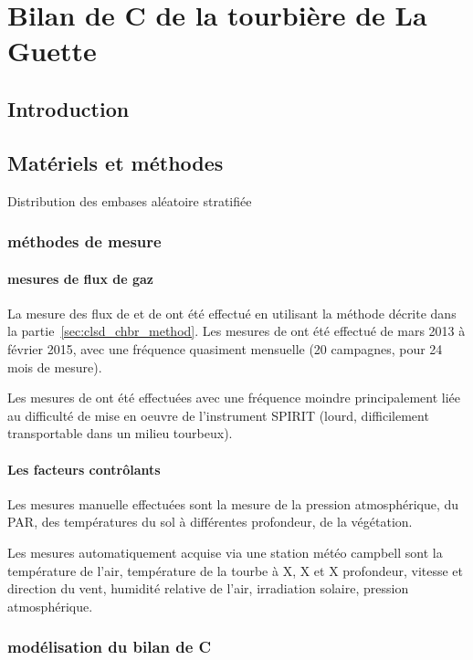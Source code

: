 \chapter{Bilan de C de la tourbière de La Guette}
\newpage

\section{Introduction}

\section{Matériels et méthodes}

Distribution des embases aléatoire stratifiée

\subsection{méthodes de mesure}

\subsubsection{mesures de flux de gaz}
La mesure des flux de \coo et de \chh ont été effectué en utilisant la méthode décrite dans la partie~\ref{sec:clsd_chbr_method}.
Les mesures de \coo ont été effectué de mars 2013 à février 2015, avec une fréquence quasiment mensuelle (20 campagnes, pour 24 mois de mesure).

Les mesures de \chh ont été effectuées avec une fréquence moindre principalement liée au difficulté de mise en oeuvre de l'instrument SPIRIT (lourd, difficilement transportable dans un milieu tourbeux).

\subsubsection{Les facteurs contrôlants}

Les mesures manuelle effectuées sont la mesure de la pression atmosphérique, du PAR, des températures du sol à différentes profondeur, de la végétation.

Les mesures automatiquement acquise via une station météo campbell sont la température de l'air, température de la tourbe à X, X et X profondeur, vitesse et direction du vent, humidité relative de l'air, irradiation solaire, pression atmosphérique.

\subsection{modélisation du bilan de C}

